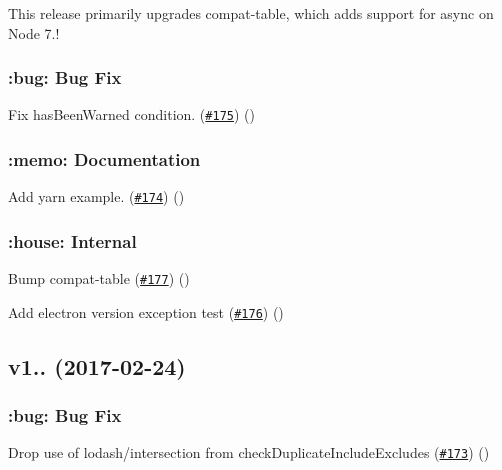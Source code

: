 This release primarily upgrades {\ttfamily compat-\/table}, which adds support for async on Node 7.!

\subsubsection*{\+:bug\+: Bug Fix}


\begin{DoxyItemize}
\item Fix has\+Been\+Warned condition. (\href{https://github.com/babel/babel-preset-env/pull/175}{\tt \#175}) ()
\end{DoxyItemize}

\subsubsection*{\+:memo\+: Documentation}


\begin{DoxyItemize}
\item Add yarn example. (\href{https://github.com/babel/babel-preset-env/pull/174}{\tt \#174}) ()
\end{DoxyItemize}

\subsubsection*{\+:house\+: Internal}


\begin{DoxyItemize}
\item Bump compat-\/table (\href{https://github.com/babel/babel-preset-env/pull/177}{\tt \#177}) ()
\item Add electron version exception test (\href{https://github.com/babel/babel-preset-env/pull/176}{\tt \#176}) ()
\end{DoxyItemize}

\subsection*{v1.. (2017-\/02-\/24)}

\subsubsection*{\+:bug\+: Bug Fix}


\begin{DoxyItemize}
\item Drop use of lodash/intersection from check\+Duplicate\+Include\+Excludes (\href{https://github.com/babel/babel-preset-env/pull/173}{\tt \#173}) ()
\end{DoxyItemize}

